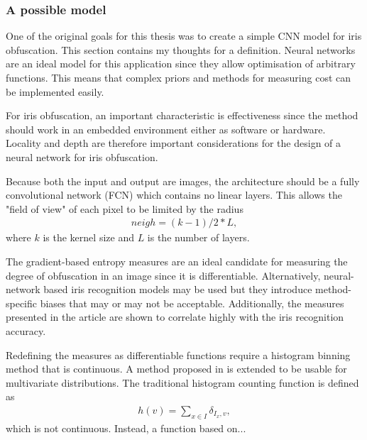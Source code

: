\subsubsection{A possible model}
One of the original goals for this thesis was to create a simple CNN model for iris obfuscation. This section contains my thoughts for a definition. Neural networks are an ideal model for this application since they allow optimisation of arbitrary functions. This means that complex priors and methods for measuring cost can be implemented easily. 

For iris obfuscation, an important characteristic is effectiveness since the method should work in an embedded environment either as software or hardware. Locality and depth are therefore important considerations for the design of a neural network for iris obfuscation.

Because both the input and output are images, the architecture should be a fully convolutional network (FCN) which contains no linear layers. This allows the "field of view" of each pixel to be limited by the radius
\begin{align}
    neigh = (k-1)/2*L,
\end{align}
where $k$ is the kernel size and $L$ is the number of layers. 

The gradient-based entropy measures are an ideal candidate for measuring the degree of obfuscation in an image since it is differentiable. Alternatively, neural-network based iris recognition models may be used \parencite{nguyen2017iris, gangwar2016deepirisnet} but they introduce method-specific biases that may or may not be acceptable. Additionally, the measures presented in the article are shown to correlate highly with the iris recognition accuracy.

Redefining the measures as differentiable functions require a histogram binning method that is continuous. A method proposed in \parencite{avi2019hue} is extended to be usable for multivariate distributions. The traditional histogram counting function is defined as
\begin{align}
	h(v) = \sum_{x\in I} \delta_{I_x, v},
\end{align}
which is not continuous. Instead, a function based on...

